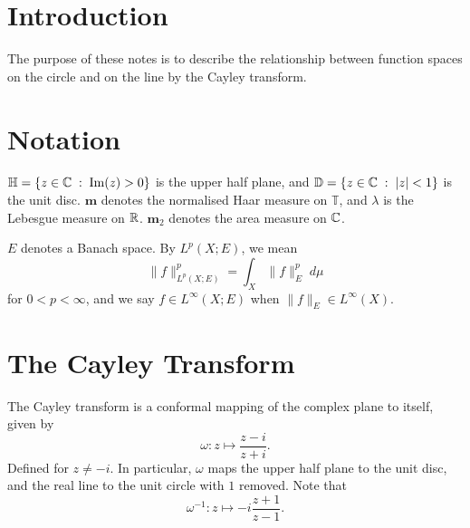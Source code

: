 \documentclass{unswmaths}
\begin{document}
\subject{}
\author{}
\title{}
\studentno{}


\newcommand{\Real}{\operatorname{Re}}
\newcommand{\Img}{\operatorname{Im}}
\newcommand{\lan}{\langle}
\newcommand{\ran}{\rangle}
\newcommand{\Proj}{\mathbb{P}}
\newcommand{\isom}{\cong}
\newcommand{\id}{{\operatorname{id}}}
\newcommand{\ha}{\boldsymbol{m}}
\newcommand{\Circ}{\mathbb{T}}
\newcommand{\BMO}{{BMO}}
\newcommand{\sgn}{\operatorname{sgn}}
\newcommand{\Diff}{\mathcal{D}}
\newcommand{\pvint}{\mathrm{p.v.}\int}
\newcommand{\Half}{\mathbb{H}}
\newcommand{\Disc}{\mathbb{D}}


\section*{Introduction}
The purpose of these notes is to describe the relationship between
function spaces on the circle and on the line by the Cayley transform.

\section*{Notation}
$\Half = \{z \in \Cplx\;:\;\Img(z) > 0\}$ is the upper half plane,
and $\Disc = \{z \in \Cplx\;:\;|z| < 1\}$ is the unit disc. $\ha$
denotes the normalised Haar measure on $\Circ$, and $\lambda$ is the Lebesgue measure 
on $\mathbb{R}$. $\ha_2$ denotes the area measure on $\mathbb{C}$.


$E$ denotes a Banach space. By $L^p(X;E)$, we mean
\begin{equation*}
    \|f\|_{L^p(X;E)}^p = \int_X \|f\|_E^p\;d\mu
\end{equation*}
for $0 < p < \infty$, and we say $f \in L^\infty(X;E)$ when $\|f\|_E \in L^\infty(X)$. 

\section*{The Cayley Transform}
The Cayley transform is a conformal mapping of the complex plane to itself, given by
\begin{equation*}
    \omega: z\mapsto \frac{z-i}{z+i}.
\end{equation*}
Defined for $z \neq -i$. In particular, $\omega$ maps the upper half plane to the unit disc, 
and the real line to the unit circle with $1$ removed. Note that
\begin{equation*}
    \omega^{-1}: z\mapsto -i\frac{z+1}{z-1}.
\end{equation*}
\end{document}
